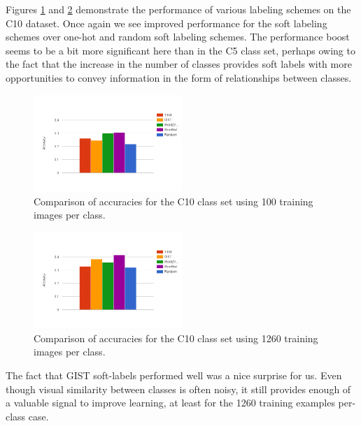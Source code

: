 Figures \ref{fig:10_1-train_100} and \ref{fig:10_1-train_1260} demonstrate the
performance of various labeling schemes on the C10 dataset. Once again we see
improved performance for the soft labeling schemes over one-hot and random soft
labeling schemes. The performance boost seems to be a bit more significant here
than in the C5 class set, perhaps owing to the fact that the increase in the
number of classes provides soft labels with more opportunities to convey
information in the form of relationships between classes.

\begin{figure}[!tb]
  \centering
  \includegraphics[width=0.5\textwidth]{figs/10_1-train_100.png}
  \caption{
      Comparison of accuracies for the C10 class set using 100 training images
      per class.
  }
  \label{fig:10_1-train_100}
\end{figure}

\begin{figure}[!tb]
  \centering
  \includegraphics[width=0.5\textwidth]{figs/10_1-train_1260.png}
  \caption{
      Comparison of accuracies for the C10 class set using 1260 training images
      per class.
  }
  \label{fig:10_1-train_1260}
\end{figure}

The fact that GIST soft-labels performed well was a nice surprise for us. Even
though visual similarity between classes is often noisy, it still provides
enough of a valuable signal to improve learning, at least for the 1260 training
examples per-class case.

